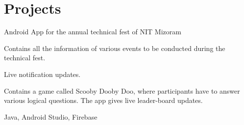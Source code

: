 
\section{Projects}
\begin{tightemize}\item Android App for the annual technical fest of NIT Mizoram
\item Contains all the information of various events to be conducted during the technical fest.
\item Live notification updates.
\item Contains a game called Scooby Dooby Doo, where participants have to answer various logical questions. The app gives live leader-board updates.
\item {} Java, Android Studio, Firebase
\end{tightemize}
\sectionsep